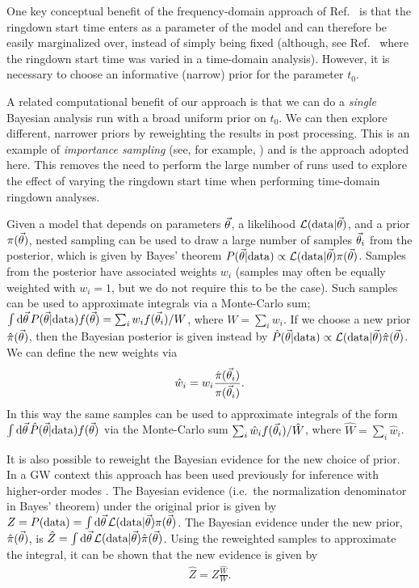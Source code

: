 One key conceptual benefit of the frequency-domain approach of Ref.~\cite{Finch:2021qph} is that the ringdown start time enters as a parameter of the model and can therefore be easily marginalized over, instead of simply being fixed (although, see Ref.~\cite{Carullo:2019flw} where the ringdown start time was varied in a time-domain analysis). 
However, it is necessary to choose an informative (narrow) prior for the parameter $t_0$.

A related computational benefit of our approach is that we can do a \emph{single} Bayesian analysis run with a broad uniform prior on $t_0$. We can then explore different, narrower priors by reweighting the results in post processing. 
This is an example of \emph{importance sampling} (see, for example, \cite{RobertChristian2013MCsm}) and is the approach adopted here.
This removes the need to perform the large number of runs used to explore the effect of varying the ringdown start time when performing time-domain ringdown analyses.

Given a model that depends on parameters $\vec{\theta}$, a likelihood $\mathcal{L}(\mathrm{data}|\vec{\theta})$, and a prior $\pi(\vec{\theta})$, nested sampling can be used to draw a large number of samples $\vec{\theta}_i$ from the posterior, which is given by Bayes' theorem $P(\vec{\theta}|\mathrm{data})\propto \mathcal{L}(\mathrm{data}|\vec{\theta}) \pi(\vec{\theta})$.
Samples from the posterior have associated weights $w_i$ (samples may often be equally weighted with $w_i=1$, but we do not require this to be the case). 
Such samples can be used to approximate integrals via a Monte-Carlo sum; $\int \mathrm{d}\vec{\theta}\,P(\vec{\theta}|\mathrm{data})f(\vec{\theta})=\sum_{i}w_i f(\vec{\theta}_i)/W$, where $W=\sum_{i}w_i$.
If we choose a new prior $\hat{\pi}(\vec{\theta})$, then the Bayesian posterior is given instead by $\hat{P}(\vec{\theta}|\mathrm{data})\propto \mathcal{L}(\mathrm{data}|\vec{\theta}) \hat{\pi}(\vec{\theta})$.
We can define the new weights via
\begin{align}
	\hat{w}_i = w_i \frac{\hat{\pi}(\vec{\theta}_i)}{\pi(\vec{\theta}_i)}.
\end{align}
In this way the same samples can be used to approximate integrals of the form $\int \mathrm{d}\vec{\theta}\,\hat{P}(\vec{\theta}|\mathrm{data})f(\vec{\theta})$ via the Monte-Carlo sum $\sum_{i}\hat{w}_i f(\vec{\theta}_i)/\hat{W}$, where $\hat{W}=\sum_{i}\hat{w}_i$.

It is also possible to reweight the Bayesian evidence for the new choice of prior.
In a GW context this approach has been used previously for inference with higher-order modes \cite{Payne:2019wmy}.
The Bayesian evidence (i.e.\ the normalization denominator in Bayes' theorem) under the original prior is given by $Z=P(\mathrm{data})=\int\mathrm{d}\vec{\theta}\,\mathcal{L}(\mathrm{data}|\vec{\theta})\pi(\vec{\theta})$.
The Bayesian evidence under the new prior, $\hat{\pi}(\vec{\theta})$, is $\hat{Z}=\int\mathrm{d}\vec{\theta}\,\mathcal{L}(\mathrm{data}|\vec{\theta})\hat{\pi}(\vec{\theta})$. Using the reweighted samples to approximate the integral, it can be shown that the new evidence is given by
\begin{align}\label{eq:new_evidence}
	\hat{Z} = Z\frac{\hat{W}}{W}.
\end{align}


